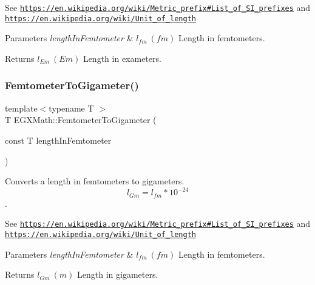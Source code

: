 See \href{https://en.wikipedia.org/wiki/Metric_prefix#List_of_SI_prefixes}{\tt https\+://en.\+wikipedia.\+org/wiki/\+Metric\+\_\+prefix\#\+List\+\_\+of\+\_\+\+S\+I\+\_\+prefixes} and \href{https://en.wikipedia.org/wiki/Unit_of_length}{\tt https\+://en.\+wikipedia.\+org/wiki/\+Unit\+\_\+of\+\_\+length} 
\begin{DoxyParams}{Parameters}
{\em length\+In\+Femtometer} & $ l_{fm}\ (fm)$ Length in femtometers. \\
\hline
\end{DoxyParams}
\begin{DoxyReturn}{Returns}
$ l_{Em}\ (Em)$ Length in exameters. 
\end{DoxyReturn}
\mbox{\label{group___e_g_x_math-_conversions-_length_conversions-_s_i-_femtometer-_s_i_gaccd849112d6d7fed98d4c4d737ec8872}} 
\subsubsection{\texorpdfstring{Femtometer\+To\+Gigameter()}{FemtometerToGigameter()}}
{\footnotesize\ttfamily template$<$typename T $>$ \\
T E\+G\+X\+Math\+::\+Femtometer\+To\+Gigameter (\begin{DoxyParamCaption}\item[{const T}]{length\+In\+Femtometer }\end{DoxyParamCaption})}



Converts a length in femtometers to gigameters. \[ l_{Gm}=l_{fm} * 10^{-24} \]. 

See \href{https://en.wikipedia.org/wiki/Metric_prefix#List_of_SI_prefixes}{\tt https\+://en.\+wikipedia.\+org/wiki/\+Metric\+\_\+prefix\#\+List\+\_\+of\+\_\+\+S\+I\+\_\+prefixes} and \href{https://en.wikipedia.org/wiki/Unit_of_length}{\tt https\+://en.\+wikipedia.\+org/wiki/\+Unit\+\_\+of\+\_\+length} 
\begin{DoxyParams}{Parameters}
{\em length\+In\+Femtometer} & $ l_{fm}\ (fm)$ Length in femtometers. \\
\hline
\end{DoxyParams}
\begin{DoxyReturn}{Returns}
$ l_{Gm}\ (m)$ Length in gigameters. 
\end{DoxyReturn}
\mbox{\label{group___e_g_x_math-_conversions-_length_conversions-_s_i-_femtometer-_s_i_gae889d6c7cbcb59336da14db49d503935}} 
